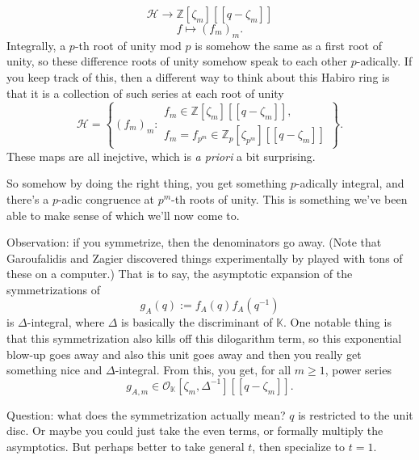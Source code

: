 \documentclass[reqno]{amsart} 
\begin{document}
\begin{equation*}
  \mathcal{H} \rightarrow \mathbb{Z}[\zeta_m][[q - \zeta_m]]
\end{equation*}
\begin{equation*}
  f \mapsto(f_m)_m.
\end{equation*}
Integrally, a $p$-th root of unity mod $p$ is somehow the same as a first root of unity, so these difference roots of unity somehow speak to each other $p$-adically.  If you keep track of this, then a different way to think about this Habiro ring is that it is a collection of such series at each root of unity
\begin{equation*}
  \mathcal{H} = \left\{
    (f_m)_m :
    \begin{array}{l}
      f_m \in \mathbb{Z}[\zeta_m][[q - \zeta_m]], \\
      f_m = f_{p^m} \in \mathbb{Z}_p[\zeta_{p^m}][[q - \zeta_m]]
    \end{array}
  \right\}.
\end{equation*}
These maps are all inejctive, which is \emph{a priori} a bit surprising.

So somehow by doing the right thing, you get something $p$-adically integral, and there's a $p$-adic congruence at $p^m$-th roots of unity.  This is something we've been able to make sense of which we'll now come to.

Observation: if you symmetrize, then the denominators go away.  (Note that Garoufalidis and Zagier discovered things experimentally by played with tons of these on a computer.)  That is to say, the asymptotic expansion of the symmetrizations of
\begin{equation*}
  g_A(q) :=  f_A(q) f_A(q^{-1})
\end{equation*}
is $\Delta$-integral, where $\Delta$ is basically the discriminant of $\mathbb{K}$.  One notable thing is that this symmetrization also kills off this dilogarithm term, so this exponential blow-up goes away and also this unit goes away and then you really get something nice and $\Delta$-integral.  From this, you get, for all $m \geq 1$, power series
\begin{equation*}
  g_{A, m} \in \mathcal{O}_{\mathbb{K}}[\zeta_m, \Delta^{-1}][[q - \zeta_m]].
\end{equation*}

\begin{remark}
  Question: what does the symmetrization actually mean?  $q$ is restricted to the unit disc.  Or maybe you could just take the even terms, or formally multiply the asymptotics.  But perhaps better to take general $t$, then specialize to $t = 1$.
\end{remark}
\end{document}
